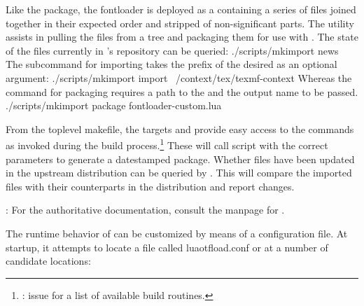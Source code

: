 Like the  package, the fontloader is deployed as a
 containing a series of \LUA files joined
together in their expected order and stripped of non-significant parts.
%
The  utility assists in pulling the files from a
\CONTEXT tree and packaging them for use with .%
%
The state of the files currently in ’s
repository can be queried:
\beginlisting
./scripts/mkimport news
\endlisting
%
The subcommand for importing takes the prefix of the desired \CONTEXT
{} as an optional argument:
\beginlisting
./scripts/mkimport import ~/context/tex/texmf-context
\endlisting
%
Whereas the command for packaging requires a path to the
 and the output name to be passed.
\beginlisting
./scripts/mkimport package fontloader-custom.lua
\endlisting

From the toplevel makefile, the targets  and
 provide easy access to the commands as invoked during
the  build process.\footnote{%
  : issue
   for a list of available build routines.
}
These will call  script with the correct
parameters to generate a datestamped package.
%
Whether files have been updated in the upstream distribution can be
queried by .
%
This will compare the imported files with their counterparts in the
\CONTEXT distribution and report changes.

\endsubsection

\endsection


\beginnarrower
  : For the authoritative documentation, consult the
  manpage for .
\endnarrower

\label{sec:conf}
The runtime behavior of  can be customized by
means of a configuration file.
At startup, it attempts to locate a file called \fileent
{luaotfload.conf} or  at a number of candidate
locations:

\begincentered
  \begindefinitions
    \beginnormalitem {}                            \endnormalitem
    \beginnormalitem {}                               \endnormalitem
    \beginnormalitem {} \endnormalitem
    \beginnormalitem {}   \endnormalitem
    \beginnormalitem {}                              \endnormalitem
  \enddefinitions
\endcentered

